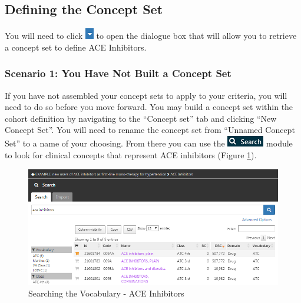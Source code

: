 \documentclass[11pt]{book}
\theoremstyle{definition}
\theoremstyle{definition}
\theoremstyle{definition}
\theoremstyle{remark}
\begin{document}
\subsection{Defining the Concept Set}\label{defining-the-concept-set}

You will need to click \includegraphics{images/Cohorts/downarrow.png} to
open the dialogue box that will allow you to retrieve a concept set to
define ACE Inhibitors.

\subsubsection*{Scenario 1: You Have Not Built a Concept
Set}\label{scenario-1-you-have-not-built-a-concept-set}

If you have not assembled your concept sets to apply to your criteria,
you will need to do so before you move forward. You may build a concept
set within the cohort definition by navigating to the ``Concept set''
tab and clicking ``New Concept Set''. You will need to rename the
concept set from ``Unnamed Concept Set'' to a name of your choosing.
From there you can use the \includegraphics{images/Cohorts/search-2.png}
module to look for clinical concepts that represent ACE inhibitors
(Figure \ref{fig:aceinhibitors}).

\begin{figure}

{\centering \includegraphics[width=1\linewidth]{images/Cohorts/aceinhibitors} 

}

\caption{Searching the Vocabulary - ACE Inhibitors}\label{fig:aceinhibitors}
\end{figure}
\end{document}

